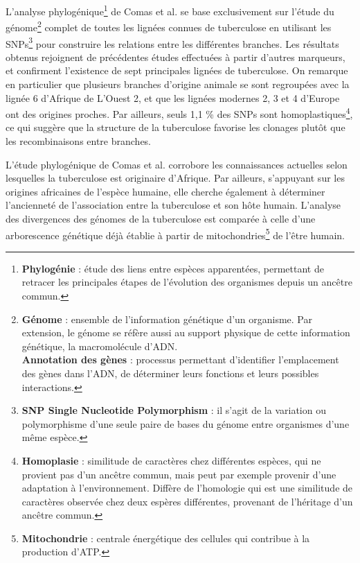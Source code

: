 \documentclass[twoside,a4paper,11pt,frenchb,openany]{report}
\begin{document}
L'analyse phylogénique\footnote{\textbf{Phylogénie} : étude des liens entre espèces apparentées, permettant de retracer les principales étapes de l'évolution des organismes depuis un ancêtre commun.} de Comas et al.\cite{comas} se base exclusivement sur l'étude du génome\footnote{\textbf{Génome} : ensemble de l'information génétique d'un organisme. Par extension, le génome se réfère aussi au support physique de cette information génétique, la macromolécule d'ADN.\\ \textbf{Annotation des gènes} : processus permettant d'identifier l'emplacement des gènes dans l'ADN, de déterminer leurs fonctions et leurs possibles interactions.} complet de toutes les lignées connues de tuberculose en utilisant les SNPs\footnote{\textbf{SNP Single Nucleotide Polymorphism} : il s'agit de la variation ou polymorphisme d'une seule paire de bases du génome entre organismes d'une même espèce.} pour construire les relations entre les différentes branches. Les résultats obtenus rejoignent de précédentes études effectuées à partir d'autres marqueurs, et confirment l'existence de sept principales lignées de tuberculose. On remarque en particulier que plusieurs branches d'origine animale se sont regroupées avec la lignée 6 d'Afrique de L'Ouest 2, et que les lignées modernes 2, 3 et 4 d'Europe ont des origines proches. Par ailleurs, seuls 1,1 \% des SNPs sont homoplastiques\footnote{\textbf{Homoplasie} : similitude de caractères chez différentes espèces, qui ne provient pas d'un ancêtre commun, mais peut par exemple provenir d'une adaptation à l'environnement. Diffère de l'homologie qui est une similitude de caractères observée chez deux espères différentes, provenant de l'héritage d'un ancêtre commun.}, ce qui suggère que la structure de la tuberculose favorise les clonages plutôt que les recombinaisons entre branches.  


L'étude phylogénique de Comas et al.\cite{comas} corrobore les connaissances actuelles selon lesquelles la tuberculose est originaire d'Afrique. Par ailleurs, s'appuyant sur les origines africaines de l'espèce humaine, elle cherche également à déterminer l'ancienneté de l'association entre la tuberculose et son hôte humain. L'analyse des divergences des génomes de la tuberculose est comparée à celle d'une arborescence génétique déjà établie à partir de mitochondries\footnote{\textbf{Mitochondrie} : centrale énergétique des cellules qui contribue à la production d'ATP.} de l'être humain. 
\end{document}
